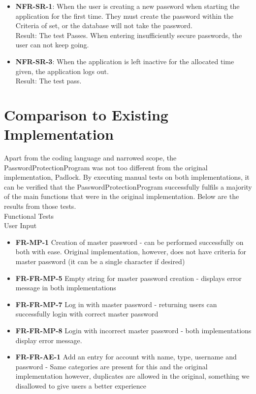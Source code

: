 \documentclass[12pt, titlepage]{article}
\begin{document}
		\begin{itemize}
			
			\item \textbf{NFR-SR-1}: When the user is creating a new password when starting the application for the first time. They must create the password within the Criteria of set, or the database will not take the password.\\
			Result: The test Passes. When entering insufficiently secure passwords, the user can not keep going.

			\item \textbf{NFR-SR-3}: When the application is left inactive for the allocated time given, the application logs out.\\
			Result: The test pass.

		\end{itemize}
	
\section{Comparison to Existing Implementation}	

	Apart from the coding language and narrowed scope, the PasswordProtectionProgram was not too different from the original implementation, Padlock. By executing manual tests on both implementations, it can be verified that the PasswordProtectionProgram successfully fulfils a majority of the main functions that were in the original implementation. Below are the results from those tests.\\
	
	Functional Tests\\

	\quad User Input

	\begin{itemize}
	
		\item \textbf{FR-MP-1} Creation of master password - can be performed successfully on both with ease. Original implementation, however, does not have criteria for master password (it can be a single character if desired)
		\item \textbf{FR-FR-MP-5} Empty string for master password creation - displays error message in both implementations
		\item \textbf{FR-FR-MP-7} Log in with master password - returning users can successfully login with correct master password
		\item \textbf{FR-FR-MP-8} Login with incorrect master password - both implementations display error message.
		\item \textbf{FR-FR-AE-1} Add an entry for account with name, type, username and password - Same categories are present for this and the original implementation however, duplicates are allowed in the original, something we disallowed to give users a better experience
	
	\end{itemize}
	
\end{document}
